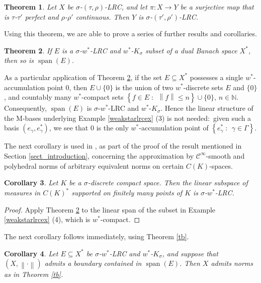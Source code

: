 \documentclass[12pt,reqno]{amsart}
\newcommand{\lspan}[1]{\ensuremath{\aspan({#1})}}
\newcommand{\map}[3]{\ensuremath{{#1}:{#2}\to{#3}}}
\newcommand{\n}[1]{\ensuremath{\left\|{#1}\right\|}}
\newcommand{\N}{\mathbb{N}}
\newcommand{\ndot}{\ensuremath{\left\|\cdot\right\|}}
\newcommand{\set}[2]{\ensuremath{\left\{{#1}\;:\;\,{#2}\right\}}}
\newcommand{\weakstar}{\ensuremath{w^*}}
\DeclareMathOperator{\aspan}{span}
\newtheorem{thm}{Theorem}[section]
\newtheorem{cor}[thm]{Corollary}
\theoremstyle{definition}
\begin{document}
\begin{thm}\label{perfectimage}
Let $X$ be $\sigma$-$(\tau,\rho)$-LRC, and let $\map{\pi}{X}{Y}$ be a surjective map that is $\tau$-$\tau'$ perfect and $\rho$-$\rho'$ continuous. Then $Y$ is $\sigma$-$(\tau',\rho')$-LRC.
\end{thm}

Using this theorem, we are able to prove a series of further results and corollaries.

\begin{thm}\label{linspan}
If $E$ is a $\sigma$-$\weakstar$-LRC and $\weakstar$-$K_\sigma$ subset of a dual Banach space $X^*$, then so is $\lspan{E}$.
\end{thm}

As a particular application of Theorem \ref{linspan}, if the set $E \subseteq X^*$ possesses a single $w^*$-accumulation point $0$, then $E \cup \{0\}$ is the union of two $w^*$-discrete sets $E$ and $\{0\}$, and countably many $w^*$-compact sets $\set{f \in E}{\n{f} \leqslant n} \cup \{0\}$, $n \in \N$. Consequently, $\lspan{E}$ is $\sigma$-$\weakstar$-LRC and $\weakstar$-$K_\sigma$. Hence the linear structure of the M-bases underlying Example \ref{weakstarlrcex} (3) is not needed:~given such a basis $(e_\gamma,e^*_\gamma)$, we see that $0$ is the only $w^*$-accumulation point of $\set{e^*_\gamma}{\gamma \in \Gamma}$.

The next corollary is used in \cite[Section 7]{st:18}, as part of the proof of the result mentioned in Section \ref{sect_introduction}, concerning the approximation by $\mathscr{C}^\infty$-smooth and polyhedral norms of arbitrary equivalent norms on certain $C(K)$-spaces.

\begin{cor} Let $K$ be a $\sigma$-discrete compact space. Then the linear subspace of measures in $C(K)^*$ supported on finitely many points of $K$ is $\sigma$-$w^*$-LRC.
\end{cor}

\begin{proof} Apply Theorem \ref{linspan} to the linear span of the subset in Example \ref{weakstarlrcex} (4), which is $w^*$-compact.
\end{proof}

The next corollary follows immediately, using Theorem \ref{tb}.

\begin{cor}\label{bdy-lin-span}
Let $E\subseteq X^*$ be $\sigma$-$\weakstar$-LRC and $\weakstar$-$K_\sigma$, and suppose that $(X,\ndot)$ admits a boundary contained in $\lspan{E}$. Then $X$ admits norms as in Theorem \ref{tb}.
\end{cor}
\end{document}
